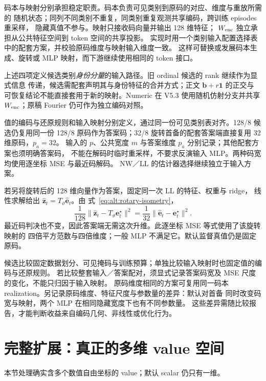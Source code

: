 \documentclass[11pt,UTF8,fontset=fandol]{ctexart}
\numberwithin{equation}{section}
\theoremstyle{definition}
\begin{document}
码本与映射分别承担稳定职责。码本负责可见类别到原码的对应、维度与重放所需的
随机状态；同列不同类别不重复，同类别重复观测共享编码，跨训练 episodes 重采样，
隐藏真值不参与。映射只接收码向量并输出 128 维特征；
$W_{\rm enc}$ 独立承担从公共特征空间到 token 空间的共享投影。
实现时用一个类别输入配置选择表中的配套方案，并校验原码维度与映射输入维度一致。
这样可替换或发展码本生成、旋转或 MLP 映射，而下游继续使用相同的 token 接口。

上述四项定义候选类别\emph{身份分量}的输入路径。旧 ordinal 候选的 rank 继续作为显式信息
传递，候选需配套声明其与身份特征的合并方式；正文 $\bm b+r\bm1$ 的正交与
可恢复结论不能直接套用于新的映射。Numeric 在 V5.3 使用随机仿射分支并共享 $W_{\rm enc}$；原稿 Fourier 仍可作为独立编码对照。

值的编码与还原规则和输入映射分别定义，通过同一份可见类别表对齐。128/8 候选仍复用同一份
128/8 原码作为答案码；32/8 旋转首备的配套答案端直接复用 32 维原码，$p_a=32$。
输入的 $p$、公共宽度 $m$ 与答案维度 $p_a$ 分别记录；其他配套方案也须明确答案码，
不能在解码时临时重采样，不要求反演输入 MLP。两种码宽均使用逐坐标 MSE 与最近码解码。
NW／LL 的估计器选择继续独立于输入方案。

若另将旋转后的 128 维向量作为答案，固定同一次 LL 的特征、权重与 ridge，
线性求解给出 $\widehat{\bm z}_t=T_\vartheta\widehat{\bm e}_t$。由
式~\eqref{eq:alt:rotary-isometry}，
\begin{equation}
 \frac1{128}\|\widehat{\bm z}_t-T_\vartheta\bm e_t^\star\|^2
 =\frac1{32}\|\widehat{\bm e}_t-\bm e_t^\star\|^2.
 \label{eq:alt:rotary-answer-mse}
\end{equation}
最近码判决也不变，因此答案端无需这次升维。此逐坐标 MSE 等式使用了该旋转映射的
四倍平方范数与四倍维度；一般 MLP 不满足它。默认监督真值仍是固定原码。

候选比较固定数据划分、可见掩码与训练预算；单独比较输入映射时也固定值的编码与还原规则。
若比较整套输入／答案配对，须显式记录答案码宽及 MSE 尺度的变化，不能只归因于输入映射。
原码维度相同的方案可复用同一码本 realization。另记录原码维度、特征尺度与参数量的差异：默认对首备
同时改变码宽与映射，两个 MLP 在相同隐藏宽度下也有不同参数量。
这些差异需随比较报告，才能判断收益来自编码几何、非线性或优化行为。



\section{完整扩展：真正的多维 value 空间}
\label{v52:app:space-extension}
本节处理确实含多个数值自由坐标的 value；默认 scalar 仍只有一维。
\end{document}
